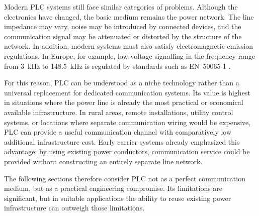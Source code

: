 Modern PLC systems still face similar categories of problems. Although the electronics have changed, the basic medium remains the power network. The line impedance may vary, noise may be introduced by connected devices, and the communication signal may be attenuated or distorted by the structure of the network. In addition, modern systems must also satisfy electromagnetic emission regulations. In Europe, for example, low-voltage signalling in the frequency range from 3~kHz to 148.5~kHz is regulated by standards such as EN~50065-1 \cite{CENELEC.2011.EN50065}.

For this reason, PLC can be understood as a niche technology rather than a universal replacement for dedicated communication systems. Its value is highest in situations where the power line is already the most practical or economical available infrastructure. In rural areas, remote installations, utility control systems, or locations where separate communication wiring would be expensive, PLC can provide a useful communication channel with comparatively low additional infrastructure cost. Early carrier systems already emphasized this advantage: by using existing power conductors, communication service could be provided without constructing an entirely separate line network\cite{Wolfe1925CarrierTelephonyHighVoltagePowerLines}.

The following sections therefore consider PLC not as a perfect communication medium, but as a practical engineering compromise. Its limitations are significant, but in suitable applications the ability to reuse existing power infrastructure can outweigh those limitations.